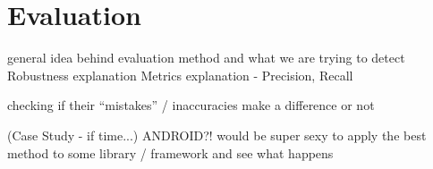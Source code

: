 \chapter{Evaluation}
	general idea behind evaluation method and what we are trying to detect
	Robustness explanation
	Metrics explanation - Precision, Recall

    checking if their ``mistakes'' / inaccuracies make a difference or not

	(Case Study - if time...)
		ANDROID?!
		would be super sexy to apply the best method to some library / framework and see what happens
